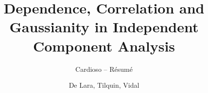 \documentclass[a4paper]{article}
\title{Dependence, Correlation and Gaussianity in Independent Component Analysis}
\subtitle{Cardioso -- Résumé}
\author{De Lara, Tilquin, Vidal}
\date{}
\begin{document}
 

\zztitre







{}
\nocite{*}

\label{lastpage}
\end{document}
